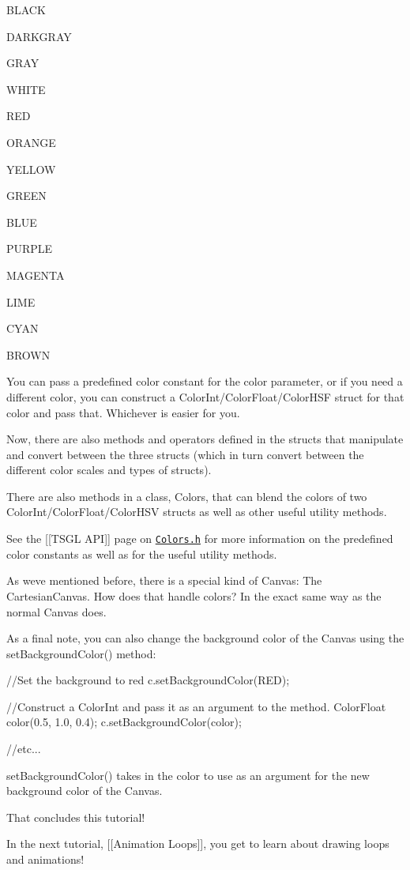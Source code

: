 \begin{DoxyItemize}
\item {\ttfamily B\+L\+A\+C\+K}
\item {\ttfamily D\+A\+R\+K\+G\+R\+A\+Y}
\item {\ttfamily G\+R\+A\+Y}
\item {\ttfamily W\+H\+I\+T\+E}
\item {\ttfamily R\+E\+D}
\item {\ttfamily O\+R\+A\+N\+G\+E}
\item {\ttfamily Y\+E\+L\+L\+O\+W}
\item {\ttfamily G\+R\+E\+E\+N}
\item {\ttfamily B\+L\+U\+E}
\item {\ttfamily P\+U\+R\+P\+L\+E}
\item {\ttfamily M\+A\+G\+E\+N\+T\+A}
\item {\ttfamily L\+I\+M\+E}
\item {\ttfamily C\+Y\+A\+N}
\item {\ttfamily B\+R\+O\+W\+N}
\end{DoxyItemize}

You can pass a predefined color constant for the color parameter, or if you need a different color, you can construct a Color\+Int/\+Color\+Float/\+Color\+H\+S\+F struct for that color and pass that. Whichever is easier for you.

Now, there are also methods and operators defined in the structs that manipulate and convert between the three structs (which in turn convert between the different color scales and types of structs).

There are also methods in a class, Colors, that can blend the colors of two Color\+Int/\+Color\+Float/\+Color\+H\+S\+V structs as well as other useful utility methods.

See the \mbox{[}\mbox{[}T\+S\+G\+L A\+P\+I\mbox{]}\mbox{]} page on \href{http://calvin-cs.github.io/TSGL/html/classtsgl_1_1_colors.html}{\tt Colors.\+h} for more information on the predefined color constants as well as for the useful utility methods.

As we\textquotesingle{}ve mentioned before, there is a special kind of Canvas\+: The Cartesian\+Canvas. How does that handle colors? In the exact same way as the normal Canvas does.

As a final note, you can also change the background color of the Canvas using the set\+Background\+Color() method\+:


\begin{DoxyCode}
\textcolor{comment}{//Set the background to red}
  c.setBackgroundColor(RED);

\textcolor{comment}{//Construct a ColorInt and pass it as an argument to the method.}
  ColorFloat color(0.5, 1.0, 0.4);
  c.setBackgroundColor(color);

\textcolor{comment}{//etc...}
\end{DoxyCode}


set\+Background\+Color() takes in the color to use as an argument for the new background color of the Canvas.

That concludes this tutorial!

In the next tutorial, \mbox{[}\mbox{[}Animation Loops\mbox{]}\mbox{]}, you get to learn about drawing loops and animations! 